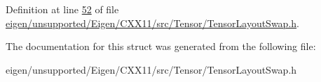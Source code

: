 Definition at line \hyperlink{eigen_2unsupported_2_eigen_2_c_x_x11_2src_2_tensor_2_tensor_layout_swap_8h_source_l00052}{52} of file \hyperlink{eigen_2unsupported_2_eigen_2_c_x_x11_2src_2_tensor_2_tensor_layout_swap_8h_source}{eigen/unsupported/\+Eigen/\+C\+X\+X11/src/\+Tensor/\+Tensor\+Layout\+Swap.\+h}.



The documentation for this struct was generated from the following file\+:\begin{DoxyCompactItemize}
\item 
eigen/unsupported/\+Eigen/\+C\+X\+X11/src/\+Tensor/\+Tensor\+Layout\+Swap.\+h\end{DoxyCompactItemize}
